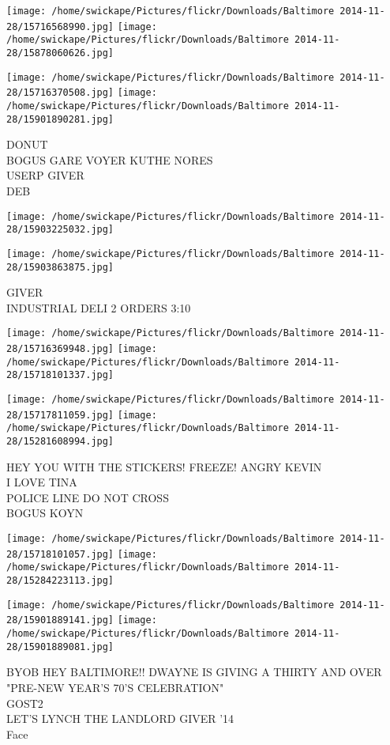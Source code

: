 \documentclass[10pt,letterpaper]{article}
\begin{document}
\texttt{[image: /home/swickape/Pictures/flickr/Downloads/Baltimore 2014-11-28/15716568990.jpg]}
\texttt{[image: /home/swickape/Pictures/flickr/Downloads/Baltimore 2014-11-28/15878060626.jpg]}

\texttt{[image: /home/swickape/Pictures/flickr/Downloads/Baltimore 2014-11-28/15716370508.jpg]}
\texttt{[image: /home/swickape/Pictures/flickr/Downloads/Baltimore 2014-11-28/15901890281.jpg]}

DONUT\\
BOGUS GARE VOYER KUTHE NORES\\
USERP GIVER\\
DEB
\pagebreak

\texttt{[image: /home/swickape/Pictures/flickr/Downloads/Baltimore 2014-11-28/15903225032.jpg]}

\vspace{0.25in}
\texttt{[image: /home/swickape/Pictures/flickr/Downloads/Baltimore 2014-11-28/15903863875.jpg]}

GIVER\\
INDUSTRIAL DELI 2 ORDERS 3:10
\pagebreak

\texttt{[image: /home/swickape/Pictures/flickr/Downloads/Baltimore 2014-11-28/15716369948.jpg]}
\texttt{[image: /home/swickape/Pictures/flickr/Downloads/Baltimore 2014-11-28/15718101337.jpg]}

\texttt{[image: /home/swickape/Pictures/flickr/Downloads/Baltimore 2014-11-28/15717811059.jpg]}
\texttt{[image: /home/swickape/Pictures/flickr/Downloads/Baltimore 2014-11-28/15281608994.jpg]}

HEY YOU WITH THE STICKERS!  FREEZE!  ANGRY KEVIN\\
I LOVE TINA\\
POLICE LINE DO NOT CROSS\\
BOGUS KOYN
\pagebreak

\texttt{[image: /home/swickape/Pictures/flickr/Downloads/Baltimore 2014-11-28/15718101057.jpg]}
\texttt{[image: /home/swickape/Pictures/flickr/Downloads/Baltimore 2014-11-28/15284223113.jpg]}

\texttt{[image: /home/swickape/Pictures/flickr/Downloads/Baltimore 2014-11-28/15901889141.jpg]}
\texttt{[image: /home/swickape/Pictures/flickr/Downloads/Baltimore 2014-11-28/15901889081.jpg]}

BYOB HEY BALTIMORE!! DWAYNE IS GIVING A THIRTY AND OVER "PRE{-}NEW YEAR'S 70'S CELEBRATION"\\
GOST2\\
LET'S LYNCH THE LANDLORD GIVER '14\\
Face
\pagebreak
\end{document}
